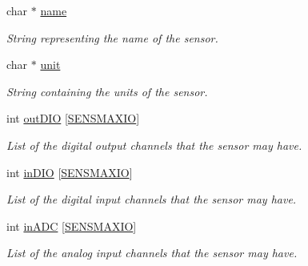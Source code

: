 \begin{DoxyCompactItemize}
\item 
\mbox{\label{struct_sensor___a6f92232276258bcd8651226b9e41dc28}} 
char $\ast$ \hyperlink{struct_sensor___a6f92232276258bcd8651226b9e41dc28}{name}
\begin{DoxyCompactList}\small\item\em String representing the name of the sensor. \end{DoxyCompactList}\item 
\mbox{\label{struct_sensor___a8e90ba064a85a2da2e7d9cc7c880c5d4}} 
char $\ast$ \hyperlink{struct_sensor___a8e90ba064a85a2da2e7d9cc7c880c5d4}{unit}
\begin{DoxyCompactList}\small\item\em String containing the units of the sensor. \end{DoxyCompactList}\item 
\mbox{\label{struct_sensor___a5c9bc879e2ecade4a96a3100cc63c92c}} 
int \hyperlink{struct_sensor___a5c9bc879e2ecade4a96a3100cc63c92c}{out\+D\+IO} \mbox{[}\hyperlink{_sensor_8h_a2345d78555d279eeaef981d064465792}{S\+E\+N\+S\+M\+A\+X\+IO}\mbox{]}
\begin{DoxyCompactList}\small\item\em List of the digital output channels that the sensor may have. \end{DoxyCompactList}\item 
\mbox{\label{struct_sensor___a6cb0fcb478a4d453ef3eb71a5a513b5d}} 
int \hyperlink{struct_sensor___a6cb0fcb478a4d453ef3eb71a5a513b5d}{in\+D\+IO} \mbox{[}\hyperlink{_sensor_8h_a2345d78555d279eeaef981d064465792}{S\+E\+N\+S\+M\+A\+X\+IO}\mbox{]}
\begin{DoxyCompactList}\small\item\em List of the digital input channels that the sensor may have. \end{DoxyCompactList}\item 
\mbox{\label{struct_sensor___a0d9e4ea7c43666e3738f1dbef509ad02}} 
int \hyperlink{struct_sensor___a0d9e4ea7c43666e3738f1dbef509ad02}{in\+A\+DC} \mbox{[}\hyperlink{_sensor_8h_a2345d78555d279eeaef981d064465792}{S\+E\+N\+S\+M\+A\+X\+IO}\mbox{]}
\begin{DoxyCompactList}\small\item\em List of the analog input channels that the sensor may have. \end{DoxyCompactList}\item 

\end{DoxyCompactItemize}
